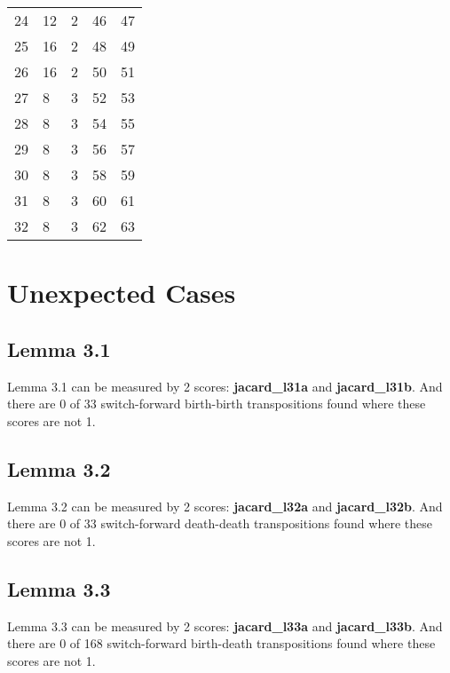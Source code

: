 \documentclass{article}
\begin{document}
\begin{center}
\begin{tabular}{lllrr}
\cline{1-5} \cline{2-5}
24 & 12 & 2 & 46 & 47 \\
\cline{1-5} \cline{2-5}
25 & 16 & 2 & 48 & 49 \\
\cline{1-5} \cline{2-5}
26 & 16 & 2 & 50 & 51 \\
\cline{1-5} \cline{2-5}
27 & 8 & 3 & 52 & 53 \\
\cline{1-5} \cline{2-5}
28 & 8 & 3 & 54 & 55 \\
\cline{1-5} \cline{2-5}
29 & 8 & 3 & 56 & 57 \\
\cline{1-5} \cline{2-5}
30 & 8 & 3 & 58 & 59 \\
\cline{1-5} \cline{2-5}
31 & 8 & 3 & 60 & 61 \\
\cline{1-5} \cline{2-5}
32 & 8 & 3 & 62 & 63 \\
\cline{1-5} \cline{2-5}
\bottomrule
\end{tabular}

\end{center}


\section{Unexpected Cases}
\subsection{Lemma 3.1}

\par Lemma 3.1 can be measured by 2 scores: \textbf{jacard\_l31a} and \textbf{jacard\_l31b}.
And there are 0 of 33 switch-forward birth-birth transpositions found where these scores are not 1.

\subsection{Lemma 3.2}

\par Lemma 3.2 can be measured by 2 scores: \textbf{jacard\_l32a} and \textbf{jacard\_l32b}.
And there are 0 of 33 switch-forward death-death transpositions found where these scores are not 1.

\subsection{Lemma 3.3}

\par Lemma 3.3 can be measured by 2 scores: \textbf{jacard\_l33a} and \textbf{jacard\_l33b}.
And there are 0 of 168 switch-forward birth-death transpositions found where these scores are not 1.
\end{document}
